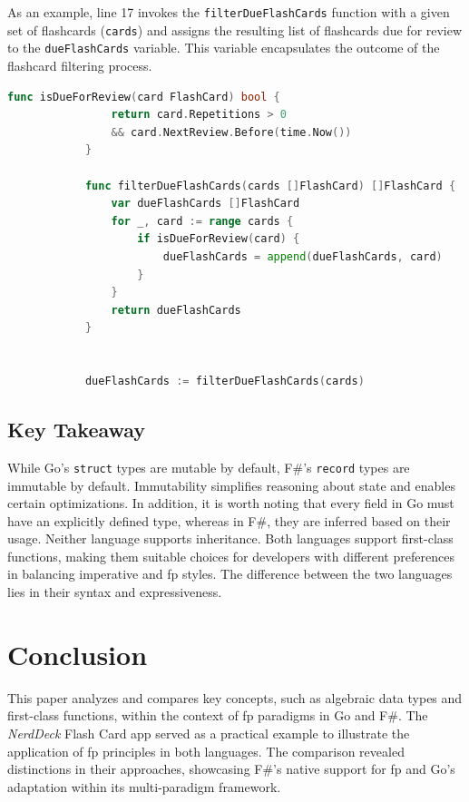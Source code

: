     As an example, line 17 invokes the \texttt{filterDueFlashCards} function with a given set of flashcards (\texttt{cards}) and assigns the resulting list of flashcards due for review to the \texttt{dueFlashCards} variable. This variable encapsulates the outcome of the flashcard filtering process.

        \begin{lstlisting}[language=go, firstnumber=1, caption={FlashCard representation in F\#}, label=l:flashcardgo]
            func isDueForReview(card FlashCard) bool {
                return card.Repetitions > 0 
                && card.NextReview.Before(time.Now())
            }
            
            func filterDueFlashCards(cards []FlashCard) []FlashCard {
                var dueFlashCards []FlashCard
                for _, card := range cards {
                    if isDueForReview(card) {
                        dueFlashCards = append(dueFlashCards, card)
                    }
                }
                return dueFlashCards
            }
            
    
            dueFlashCards := filterDueFlashCards(cards)
            \end{lstlisting}
            

    \section{Key Takeaway}\label{sec:keytakeaway}
    While Go's \texttt{struct} types are mutable by default, F\#'s \texttt{record} types are immutable by default. Immutability simplifies reasoning about state and enables certain optimizations. In addition, it is worth noting that every field in Go must have an explicitly defined type, whereas in F\#, they are inferred based on their usage. Neither language supports inheritance. Both languages support first-class functions, making them suitable choices for developers with different preferences in balancing imperative and \ac{fp} styles. The difference between the two languages lies in their syntax and expressiveness.


\chapter{Conclusion}\label{chap:conclusion}
This paper analyzes and compares key concepts, such as algebraic data types and first-class functions, within the context of \ac{fp} paradigms in Go and F\#. The \textit{NerdDeck} Flash Card \ac{app} served as a practical example to illustrate the application of \ac{fp} principles in both languages. The comparison revealed distinctions in their approaches, showcasing F\#'s native support for \ac{fp} and Go's adaptation within its multi-paradigm framework.

